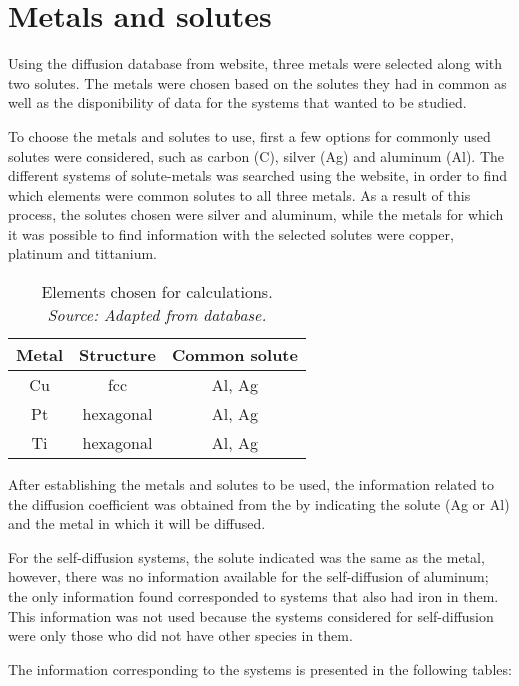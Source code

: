 \section{Metals and solutes}

Using the diffusion database from \citet{kakusan} website, three metals were selected along with two solutes. The metals were chosen based on the solutes they had in common as well as the disponibility of data for the systems that wanted to be studied.

To choose the metals and solutes to use, first a few options for commonly used solutes were considered, such as carbon (C), silver (Ag) and aluminum (Al). The different systems of solute-metals was searched using the \cite{kakusan} website, in order to find which elements were common solutes to all three metals. As a result of this process, the solutes chosen were silver and aluminum, while the metals for which it was possible to find information with the selected solutes were copper, platinum and tittanium.

\begin{table}[H]
    \centering
    \captionsetup{justification=centering}
    \begin{tabular}{ccc}
        Metal & Structure & Common solute\\ \hline \hline
        Cu & fcc & Al, Ag \\
        Pt & hexagonal & Al, Ag \\
        Ti & hexagonal & Al, Ag \\
    \end{tabular}
    \caption{Elements chosen for calculations. \\ 
    \textit{Source: Adapted from \citep{kakusan} database.}}
    \label{tab:tabla1}
\end{table}

After establishing the metals and solutes to be used, the information related to the diffusion coefficient was obtained from the \citet{kakusan} by indicating the solute (Ag or Al) and the metal in which it will be diffused.

For the self-diffusion systems, the solute indicated was the same as the metal, however, there was no information available for the self-diffusion of aluminum; the only information found corresponded to systems that also had iron in them. This information was not used because the systems considered for self-diffusion were only those who did not have other species in them.

\newpage
The information corresponding to the systems is presented in the following tables:

